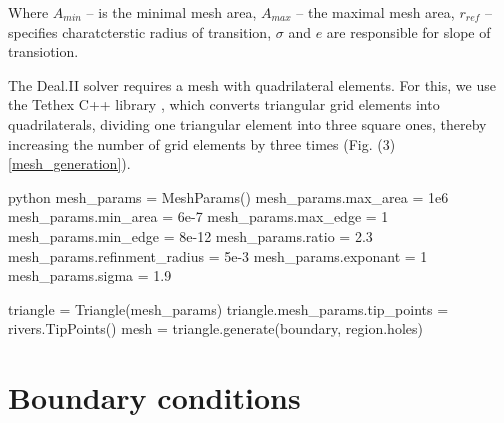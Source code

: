 \documentclass[]{pracamgr}
\begin{document}
      Where $A_{min}$ -- is the minimal mesh area, $A_{max}$ -- the maximal mesh area, $r_{ref}$ -- specifies charatcterstic radius of transition, $\sigma$ and $e$ are responsible for slope of transiotion.

      The Deal.II\cite{dealII94} solver requires a mesh with quadrilateral elements. For this, we use the Tethex C++ library \cite{tethex} , which converts triangular grid elements into quadrilaterals, dividing one triangular element into three square ones, thereby increasing the number of grid elements by three times (Fig. (3) \ref{mesh_generation}).

      \begin{mintedbox}{python}
        mesh_params = MeshParams()
        mesh_params.max_area = 1e6
        mesh_params.min_area = 6e-7
        mesh_params.max_edge = 1
        mesh_params.min_edge = 8e-12
        mesh_params.ratio = 2.3
        mesh_params.refinment_radius = 5e-3
        mesh_params.exponant = 1
        mesh_params.sigma = 1.9
      
        triangle = Triangle(mesh_params)
        triangle.mesh_params.tip_points = rivers.TipPoints()
        mesh = triangle.generate(boundary, region.holes)\end{mintedbox}

    \section{Boundary conditions}
\end{document}
